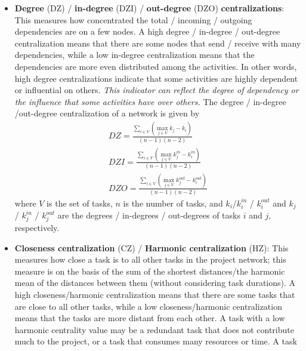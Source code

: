 \documentclass[preprint,
3p]{elsarticle} %
\begin{document}
\begin{appendices}
\begin{itemize}
  algorithm tries to find the optimal partition that minimizes the
  Hamiltonian, a measure of the energy of the system, which is
  equivalent to maximizing the Spin-Glass modularity, a measure of the
  difference between the actual and the expected number of dependencies
  within and between communities.
\item
  \textbf{Degree} (DZ) / \textbf{in-degree} (DZI) / \textbf{out-degree}
  (DZO) \textbf{centralizations}: This measures how concentrated the
  total / incoming / outgoing dependencies are on a few nodes. A high
  degree / in-degree / out-degree centralization means that there are
  some nodes that send / receive with many dependencies, while a low
  in-degree centralization means that the dependencies are more even
  distributed among the activities. In other words, high degree
  centralizations indicate that some activities are highly dependent or
  influential on others. \emph{This indicator can reflect the degree of
  dependency or the influence that some activities have over others.}
  The degree / in-degree /out-degree centralization of a network is
  given by \begin{eqnarray}
  DZ = \frac {\sum_{i \in V} (\max_{j \in V} k_j - k_i)} {(n-1)(n-2)} \label{eq:DZ} \\
  DZI = \frac {\sum_{i \in V} (\max_{j \in V} k_j^{in} - k_i^{in})} {(n-1)(n-2)} \label{DZI} \\
  DZO = \frac {\sum_{i \in V} (\max_{j \in V} k_j^{out} - k_i^{out})} {(n-1)(n-2)} \label{DZO}
  \end{eqnarray} \noindent where \(V\) is the set of tasks, \(n\) is the
  number of tasks, and \(k_i\)/\(k_i^{in}\) / \(k_i^{out}\) and \(k_j\)
  / \(k_j^{in}\) / \(k_j^{out}\) are the degrees / in-degrees /
  out-degrees of tasks \(i\) and \(j\), respectively.
\item
  \textbf{Closeness centralization} (CZ) / \textbf{Harmonic
  centralization} (HZ): This measures how close a task is to all other
  tasks in the project network; this measure is on the basis of the sum
  of the shortest distances/the harmonic mean of the distances between
  them (without considering task durations). A high closeness/harmonic
  centralization means that there are some tasks that are close to all
  other tasks, while a low closeness/harmonic centralization means that
  the tasks are more distant from each other. A task with a low harmonic
  centrality value may be a redundant task that does not contribute much
  to the project, or a task that consumes many resources or time. A task

\end{itemize}
\end{appendices}
\end{document}
